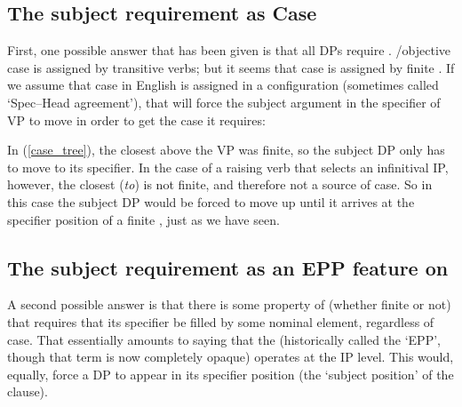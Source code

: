 \documentclass{article}
\begin{document}
    \subsection{The subject requirement as Case}
First, one possible answer that has been given is that all DPs require .
/objective case is assigned by transitive verbs; but it seems that  case is assigned by finite .
If we assume that  case in English is assigned in a  configuration (sometimes called `Spec--Head agreement'), that will force the subject argument in the specifier of VP to move in order to get the case it requires:
\begin{exe}
\small
{}
    \label{case_tree}
\end{exe}
 In (\ref{case_tree}), the closest  above the VP was finite, so the subject DP only has to move to its specifier.
 In the case of a raising verb that selects an infinitival IP, however, the closest  (\emph{to}) is not finite, and therefore not a source of  case.
 So in this case the subject DP would be forced to move up until it arrives at the specifier position of a finite , just as we have seen.

    \subsection{The subject requirement as an EPP feature on }
A second possible answer is that there is some property of  (whether finite or not) that requires that its specifier be filled by some nominal element, regardless of case.
That essentially amounts to saying that the  (historically called the `EPP', though that term is now completely opaque) operates at the IP level.
This would, equally, force a DP to appear in its specifier position (the `subject position' of the clause).  
\end{document}
